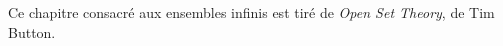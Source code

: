 \documentclass[../../../include/open-logic-chapter]{subfiles}
\begin{document}

\begin{editorial}
Ce chapitre consacré aux ensembles infinis est tiré de
\emph{Open Set Theory}, de Tim Button.
\end{editorial}

\end{document}
